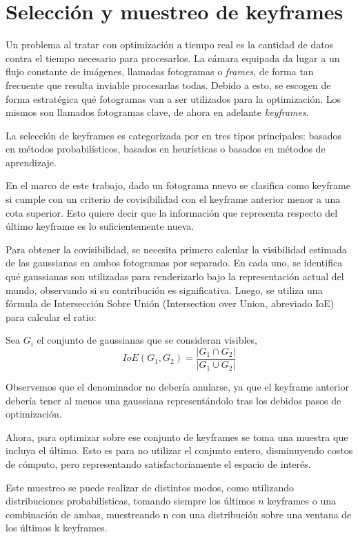 \section{Selección y muestreo de keyframes}
Un problema al tratar con optimización a tiempo real es la cantidad de datos contra el tiempo necesario para procesarlos. La cámara equipada da lugar a un flujo constante de imágenes, llamadas fotogramas o \textit{frames}, de forma tan frecuente que resulta inviable procesarlas todas. Debido a esto, se escogen de forma estratégica qué fotogramas van a ser utilizados para la optimización. Los mismos son llamados fotogramas clave, de ahora en adelante \textit{keyframes}.

La selección de keyframes es categorizada por \cite{robotics12030088} en tres tipos principales: basados en métodos probabilísticos, basados en heurísticas o basados en métodos de aprendizaje.

En el marco de este trabajo, dado un fotograma nuevo se clasifica como keyframe si cumple con un criterio de covisibilidad con el keyframe anterior menor a una cota superior. Esto quiere decir que la información que representa respecto del último keyframe es lo suficientemente nueva.

Para obtener la covisibilidad, se necesita primero calcular la visibilidad estimada de las gaussianas en ambos fotogramas por separado. En cada uno, se identifica qué gaussianas son utilizadas para renderizarlo bajo la representación actual del mundo, observando si su contribución es significativa. Luego, se utiliza una fórmula de Intersección Sobre Unión (Intersection over Union, abreviado IoE) para calcular el ratio:

Sea $G_i$ el conjunto de gaussianas que se consideran visibles,
$$
IoE (G_1, G_2) = \frac{|G_1 \cap G_2|}{|G_1 \cup G_2|} 
$$

Observemos que el denominador no debería anularse, ya que el keyframe anterior debería tener al menos una gaussiana representándolo tras los debidos pasos de optimización.



Ahora, para optimizar sobre ese conjunto de keyframes se toma una muestra que incluya el último. Esto es para no utilizar el conjunto entero, disminuyendo costos de cómputo, pero representando satisfactoriamente el espacio de interés.

Este muestreo se puede realizar de distintos modos, como utilizando distribuciones probabilísticas, tomando siempre los últimos $n$ keyframes o una combinación de ambas, muestreando n con una distribución sobre una ventana de los últimos k keyframes. 



